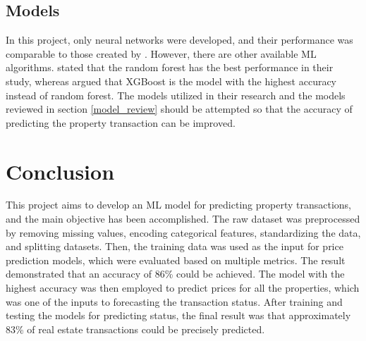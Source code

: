 \documentclass[12pt,twoside]{report}
\begin{document}
\subsection{Models}
In this project, only neural networks were developed, and their performance was comparable to those created by \citet{RN37}. However, there are other available ML algorithms. \citet{RN17} stated that the random forest has the best performance in their study, whereas \citet{RN20} argued that XGBoost is the model with the highest accuracy instead of random forest. The models utilized in their research and the models reviewed in section \ref{model_review} should be attempted so that the accuracy of predicting the property transaction can be improved. 

\section{Conclusion}
This project aims to develop an ML model for predicting property transactions, and the main objective has been accomplished. The raw dataset was preprocessed by removing missing values, encoding categorical features, standardizing the data, and splitting datasets. Then, the training data was used as the input for price prediction models, which were evaluated based on multiple metrics. The result demonstrated that an accuracy of 86\% could be achieved. The model with the highest accuracy was then employed to predict prices for all the properties, which was one of the inputs to forecasting the transaction status. After training and testing the models for predicting status, the final result was that approximately 83\% of real estate transactions could be precisely predicted. 



\end{document}
